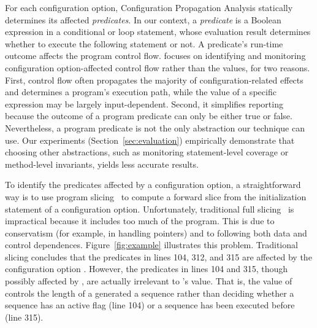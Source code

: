 For each configuration option, Configuration Propagation Analysis statically determines
its affected \textit{predicates}. In our context, a \textit{predicate}
is a Boolean expression in a conditional or loop statement, whose evaluation result
determines whether to execute the following statement or not.
A predicate's run-time outcome affects the program control flow.
\ourtool focuses on identifying and monitoring 
configuration option-affected control flow
rather than the values, for two reasons. First, control flow 
often propagates the majority of configuration-related effects
and determines a program's execution path, while
the value of a specific expression may be largely input-dependent.
Second, it simplifies reporting because the outcome of a program predicate can only be
either true or false.  Nevertheless, a program predicate is not the only
abstraction our technique can use. 
Our experiments (Section~\ref{sec:evaluation})
empirically demonstrate that choosing other abstractions,
such as monitoring statement-level coverage
or method-level invariants, yields less accurate results.


To identify the predicates affected by a configuration option, a straightforward
way is to use program slicing~\cite{Horwitz:1988} to compute
a forward slice from the initialization statement of a
configuration option. Unfortunately, traditional full slicing~\cite{Horwitz:1988}
is impractical
because it includes too much of the program.  This is due to conservatism
(for example, in handling pointers) and to following both data and control
dependences.
Figure~\ref{fig:example} illustrates
this problem.  Traditional slicing concludes that the predicates
in lines 104, 312, and 315 are affected by the configuration option .
However, the predicates in lines 104 and 315, though possibly
affected by , are actually irrelevant
to 's value. That is, the value of 
controls the length of a generated a sequence rather
than deciding whether a sequence has an active flag (line 104) or
a sequence has been executed before (line 315).

